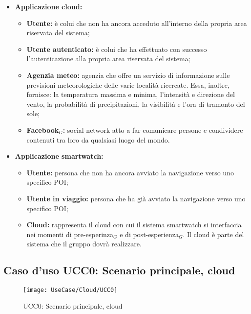 \begin{itemize}
\item \textbf{Applicazione cloud:}
\begin{itemize}
\item \textbf{Utente:} è colui che non ha ancora acceduto all'interno della propria area riservata del sistema;
\item \textbf{Utente autenticato:} è colui che ha effettuato con successo l'autenticazione alla propria area riservata del sistema;
\item \textbf{Agenzia meteo:} agenzia che offre un servizio di informazione sulle previsioni meteorologiche delle varie località ricercate. Essa, inoltre, fornisce: la temperatura massima e minima, l'intensità e direzione del vento, la probabilità di precipitazioni, la visibilità e l'ora di tramonto del sole;
\item \textbf{Facebook$_{G}$:} social network atto a far comunicare persone e condividere contenuti tra loro da qualsiasi luogo del mondo.
\end{itemize}
\item \textbf{Applicazione smartwatch:}
\begin{itemize}
\item \textbf{Utente:} persona che non ha ancora avviato la navigazione verso uno specifico POI;
\item \textbf{Utente in viaggio:} persona che ha già avviato la navigazione verso uno specifico POI;
\item \textbf{Cloud:} rappresenta il cloud con cui il sistema smartwatch si interfaccia nei momenti di pre-esperinza$_{G}$ e di post-esperienza$_{G}$. Il cloud è parte del sistema che il gruppo \GRUPPO{} dovrà realizzare.
\end{itemize}
\end{itemize}

\subsection{Caso d'uso UCC0: Scenario principale, cloud}

\begin{figure}[H]
\centering
\texttt{[image: UseCase/Cloud/UCC0]}
\caption{UCC0: Scenario principale, cloud}
\end{figure}

